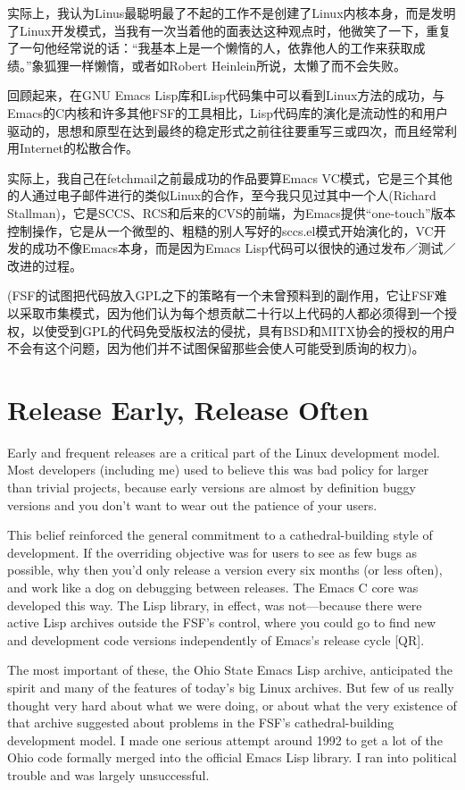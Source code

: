 \documentclass[a4paper,12pt,UTF8,twoside]{ctexbook}
\begin{document}
实际上，我认为Linus最聪明最了不起的工作不是创建了Linux内核本身，而是发明了Linux开发模式，当我有一次当着他的面表达这种观点时，他微笑了一下，重复了一句他经常说的话：“我基本上是一个懒惰的人，依靠他人的工作来获取成绩。”象狐狸一样懒惰，或者如Robert Heinlein所说，太懒了而不会失败。


回顾起来，在GNU Emacs Lisp库和Lisp代码集中可以看到Linux方法的成功，与Emacs的C内核和许多其他FSF的工具相比，Lisp代码库的演化是流动性的和用户驱动的，思想和原型在达到最终的稳定形式之前往往要重写三或四次，而且经常利用Internet的松散合作。


实际上，我自己在fetchmail之前最成功的作品要算Emacs VC模式，它是三个其他的人通过电子邮件进行的类似Linux的合作，至今我只见过其中一个人(Richard Stallman)，它是SCCS、RCS和后来的CVS的前端，为Emacs提供“one-touch”版本控制操作，它是从一个微型的、粗糙的别人写好的sccs.el模式开始演化的，VC开发的成功不像Emacs本身，而是因为Emacs Lisp代码可以很快的通过发布／测试／改进的过程。


(FSF的试图把代码放入GPL之下的策略有一个未曾预料到的副作用，它让FSF难以采取市集模式，因为他们认为每个想贡献二十行以上代码的人都必须得到一个授权，以使受到GPL的代码免受版权法的侵扰，具有BSD和MITX协会的授权的用户不会有这个问题，因为他们并不试图保留那些会使人可能受到质询的权力)。

\chapter{Release Early, Release Often}

Early and frequent releases are a critical part of the Linux development model. Most developers (including me) used to believe this was bad policy for larger than trivial projects, because early versions are almost by definition buggy versions and you don't want to wear out the patience of your users.

This belief reinforced the general commitment to a cathedral-building style of development. If the overriding objective was for users to see as few bugs as possible, why then you'd only release a version every six months (or less often), and work like a dog on debugging between releases. The Emacs C core was developed this way. The Lisp library, in effect, was not—because there were active Lisp archives outside the FSF's control, where you could go to find new and development code versions independently of Emacs's release cycle [QR].

The most important of these, the Ohio State Emacs Lisp archive, anticipated the spirit and many of the features of today's big Linux archives. But few of us really thought very hard about what we were doing, or about what the very existence of that archive suggested about problems in the FSF's cathedral-building development model. I made one serious attempt around 1992 to get a lot of the Ohio code formally merged into the official Emacs Lisp library. I ran into political trouble and was largely unsuccessful.
\end{document}
